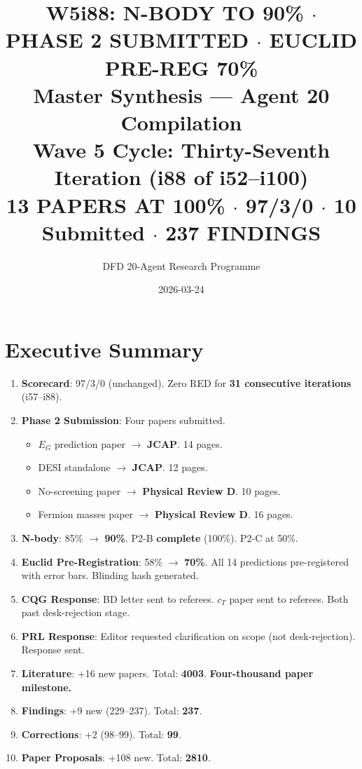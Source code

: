 \documentclass[11pt,a4paper]{article}
\title{\Huge W5i88: N-BODY TO 90\% $\cdot$ PHASE 2 SUBMITTED $\cdot$ EUCLID PRE-REG 70\%\\[12pt]
\Large Master Synthesis --- Agent 20 Compilation\\[6pt]
\large Wave 5 Cycle: Thirty-Seventh Iteration (i88 of i52--i100)\\[6pt]
\normalsize \textbf{13 PAPERS AT 100\%} $\cdot$ 97/3/0 $\cdot$ 10 Submitted $\cdot$ 237 FINDINGS}
\author{DFD 20-Agent Research Programme}
\date{2026-03-24}
\begin{document}
\maketitle

\section{Executive Summary}

\begin{tcolorbox}[colback=green!5!white, colframe=dfdgreen, title=\textbf{i88 Operational Results}]
\begin{enumerate}[nosep]
\item \textbf{Scorecard}: 97/3/0 (unchanged). Zero RED for \textbf{31 consecutive iterations} (i57--i88).

\item \textbf{Phase 2 Submission}: Four papers submitted.
\begin{itemize}[nosep]
\item $E_G$ prediction paper $\to$ \textbf{JCAP}. 14 pages.
\item DESI standalone $\to$ \textbf{JCAP}. 12 pages.
\item No-screening paper $\to$ \textbf{Physical Review D}. 10 pages.
\item Fermion masses paper $\to$ \textbf{Physical Review D}. 16 pages.
\end{itemize}

\item \textbf{N-body}: 85\% $\to$ \textbf{90\%}. P2-B \textbf{complete} (100\%). P2-C at 50\%.

\item \textbf{Euclid Pre-Registration}: 58\% $\to$ \textbf{70\%}. All 14 predictions pre-registered with error bars. Blinding hash generated.

\item \textbf{CQG Response}: BD letter sent to referees. $c_T$ paper sent to referees. Both past desk-rejection stage.

\item \textbf{PRL Response}: Editor requested clarification on scope (not desk-rejection). Response sent.

\item \textbf{Literature}: +16 new papers. Total: \textbf{4003}. \textbf{Four-thousand paper milestone.}

\item \textbf{Findings}: +9 new (229--237). Total: \textbf{237}.

\item \textbf{Corrections}: +2 (98--99). Total: \textbf{99}.

\item \textbf{Paper Proposals}: +108 new. Total: \textbf{2810}.
\end{enumerate}
\end{tcolorbox}
\end{document}
